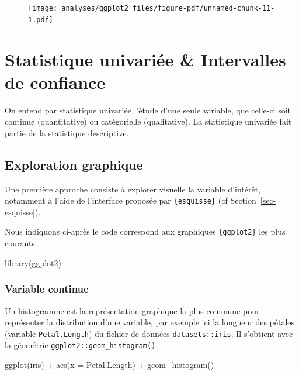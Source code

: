 \documentclass[
  letterpaper,
  DIV=11,
  numbers=noendperiod,
  oneside]{scrreprt}
\newenvironment{Shaded}{\begin{snugshade}}{\end{snugshade}}
\newcommand{\AttributeTok}[1]{\textcolor[rgb]{0.40,0.45,0.13}{#1}}
\newcommand{\FunctionTok}[1]{\textcolor[rgb]{0.28,0.35,0.67}{#1}}
\newcommand{\NormalTok}[1]{\textcolor[rgb]{0.00,0.23,0.31}{#1}}
\newcommand{\SpecialCharTok}[1]{\textcolor[rgb]{0.37,0.37,0.37}{#1}}
\begin{document}
\begin{figure}[H]

{\centering \texttt{[image: analyses/ggplot2\_files/figure-pdf/unnamed-chunk-11-1.pdf]}

}

\end{figure}

\hypertarget{sec-statistique-univariee}{%
\chapter{Statistique univariée \& Intervalles de
confiance}\label{sec-statistique-univariee}}

On entend par statistique univariée l'étude d'une seule variable, que
celle-ci soit continue (quantitative) ou catégorielle (qualitative). La
statistique univariée fait partie de la statistique descriptive.

\hypertarget{exploration-graphique}{%
\section{Exploration graphique}\label{exploration-graphique}}

Une première approche consiste à explorer visuelle la variable
d'intérêt, notamment à l'aide de l'interface proposée par
\texttt{\{esquisse\}} (cf Section~\ref{sec-esquisse}).

Nous indiquons ci-après le code correspond aux graphiques
\texttt{\{ggplot2\}} les plus courants.

\begin{Shaded}
\begin{Highlighting}[]
\FunctionTok{library}\NormalTok{(ggplot2)}
\end{Highlighting}
\end{Shaded}

\hypertarget{variable-continue}{%
\subsection{Variable continue}\label{variable-continue}}

Un histogramme est la représentation graphique la plus commune pour
représenter la distribution d'une variable, par exemple ici la longueur
des pétales (variable \texttt{Petal.Length}) du fichier de données
\texttt{datasets::iris}. Il s'obtient avec la géométrie
\texttt{ggplot2::geom\_histogram()}.

\begin{Shaded}
\begin{Highlighting}[]
\FunctionTok{ggplot}\NormalTok{(iris) }\SpecialCharTok{+}
  \FunctionTok{aes}\NormalTok{(}\AttributeTok{x =}\NormalTok{ Petal.Length) }\SpecialCharTok{+}
  \FunctionTok{geom\_histogram}\NormalTok{()}
\end{Highlighting}
\end{Shaded}
\end{document}
